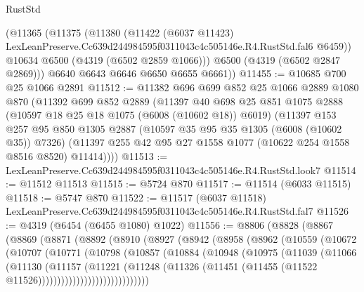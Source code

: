 \begin{lexlean}{RustStd}
\begin{coremodule}
        (@11365
          (@11375
            (@11380
              (@11422
                (@6037 @11423)
                LexLeanPreserve.Cc639d244984595f0311043c4c505146e.R4.RustStd.fal6
                @6459))
            @10634
            @6500
            (@4319 (@6502 @2859 @1066)))
          @6500
          (@4319 (@6502 @2847 @2869)))
        @6640
        @6643
        @6646
        @6650
        @6655
        @6661))
@11455 := @10685 @700 @25 @1066 @2891
@11512 := @11382
    @696
    @699
    @852
    @25
    @1066
    @2889
    @1080
    @870
    (@11392
      @699
      @852
      @2889
      (@11397
        @40
        @698
        @25
        @851
        @1075
        @2888
        (@10597 @18 @25 @18 @1075 (@6008 (@10602 @18)) @6019)
        (@11397
          @153
          @257
          @95
          @850
          @1305
          @2887
          (@10597 @35 @95 @35 @1305 (@6008 (@10602 @35)) @7326)
          (@11397 @255 @42 @95 @27 @1558 @1077 (@10622 @254 @1558 @8516 @8520) @11414))))
@11513 := LexLeanPreserve.Cc639d244984595f0311043c4c505146e.R4.RustStd.look7
@11514 := @11512 @11513
@11515 := @5724 @870
@11517 := @11514 (@6033 @11515)
@11518 := @5747 @870
@11522 := @11517 (@6037 @11518) LexLeanPreserve.Cc639d244984595f0311043c4c505146e.R4.RustStd.fal7
@11526 := @4319 (@6454 (@6455 @1080) @1022)
@11556 := @8806
    (@8828
      (@8867
        (@8869
          (@8871
            (@8892
              (@8910
                (@8927
                  (@8942
                    (@8958
                      (@8962
                        (@10559
                          (@10672
                            (@10707
                              (@10771
                                (@10798
                                  (@10857
                                    (@10884
                                      (@10948
                                        (@10975
                                          (@11039
                                            (@11066
                                              (@11130
                                                (@11157
                                                  (@11221
                                                    (@11248
                                                      (@11326
                                                        (@11451
                                                          (@11455
                                                            (@11522
                                                              @11526)))))))))))))))))))))))))))))

\end{coremodule}
\end{lexlean}
